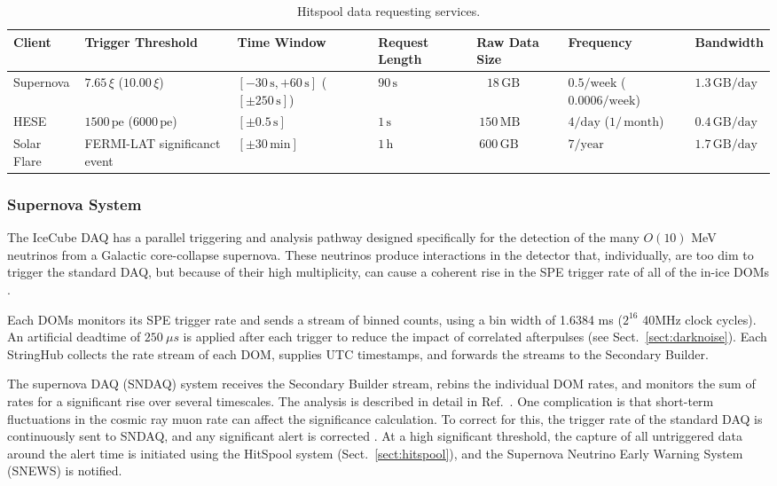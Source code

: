 \begin{table}
  \caption{Hitspool data requesting services.} 
    \centering
  \footnotesize
\begin{tabularx}{\textwidth}{XXXXXXX}
  \toprule
  Client &  Trigger Threshold & Time Window & Request Length & Raw Data Size & Frequency & Bandwidth \\
  \midrule
  Supernova & $7.65 \,\xi$ ($10.00 \,\xi$) & $[-30\,\mathrm{s},+60\,\mathrm{s}]$  ($[\pm250 \,\mathrm{s}]$)& $90 \,\mathrm{s}$& ~ $18 \,\mathrm{GB}$& $0.5/\mathrm{week}$ ($0.0006 / \mathrm{week}$)& $1.3 \,\mathrm{GB} / \mathrm{day}$\\
  HESE & $1500 \,\mathrm{pe} $  ($6000 \,\mathrm{pe} $) & $[\pm0.5\,\mathrm{s}]$& $1\,\mathrm{s}$  &  $~150\,\mathrm{MB}$ &  $4/\mathrm{day}$ ($1/\,\mathrm{month}$) & $0.4\,\mathrm{GB}/\mathrm{day}$  \\
  Solar Flare & FERMI-LAT significanct event & $[\pm30\,\mathrm{min}]$ & $1\,\mathrm{h}$& $~600\,\mathrm{GB}$& $ 7 / \mathrm{year}$& $ 1.7 \,\mathrm{GB}/\mathrm{day}$\\
\bottomrule
\end{tabularx}
\label{tab:hsclients}
\end{table}

\subsubsection{Supernova System}

The IceCube DAQ has a parallel triggering and analysis pathway designed
specifically for the detection of the many $O(10)$ MeV neutrinos from a Galactic
core-collapse supernova.  These neutrinos produce interactions in the
detector that, individually, are too dim to trigger the standard DAQ, but because of their
high multiplicity, can cause a coherent rise in the SPE trigger rate of all
of the in-ice DOMs \cite{IC3:supernova}. 

Each DOMs monitors its SPE trigger rate and sends a stream of binned
counts, using a bin width of 1.6384 ms ($2^{16}$ 40MHz clock cycles).  An
artificial deadtime of $250\ {\mu}s$ is applied after each trigger to
reduce the impact of correlated afterpulses (see
Sect.~\ref{sect:darknoise}).  Each StringHub
collects the rate stream of each DOM, supplies UTC timestamps, and
forwards the streams to the Secondary Builder.  

The supernova DAQ (SNDAQ) system receives the Secondary Builder stream,
rebins the individual DOM rates, and monitors the sum of rates for a
significant rise over several timescales.  The analysis is described in
detail in Ref.~\cite{IC3:supernova}.  One complication is that short-term
fluctuations in the cosmic ray muon rate can affect the significance
calculation.  To correct for this, the trigger rate of the standard DAQ is
continuously sent to SNDAQ, and any significant alert is corrected
\cite{IC3:icrc15_sndaq}.  At a 
high significant threshold, the capture of all untriggered data around the
alert time is initiated using the HitSpool system
(Sect.~\ref{sect:hitspool}), and the Supernova Neutrino Early Warning
System (SNEWS) \cite{SNEWS} is notified.

